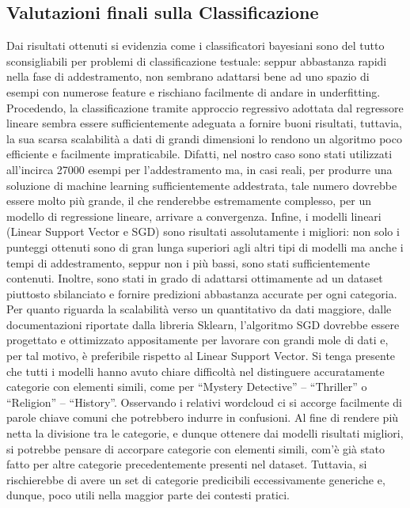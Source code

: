 \documentclass[12pt,oneside]{article}
\begin{document}
    \begin{enumerate}
    \subsection{Valutazioni finali sulla Classificazione}
    \begin{justify}
    Dai risultati ottenuti si evidenzia come i classificatori bayesiani sono del tutto sconsigliabili per problemi di classificazione testuale: seppur abbastanza rapidi nella fase di addestramento, non sembrano adattarsi bene ad uno spazio di esempi con numerose feature e rischiano facilmente di andare in underfitting.
    Procedendo, la classificazione tramite approccio regressivo adottata dal regressore lineare sembra essere sufficientemente adeguata a fornire buoni risultati, tuttavia, la sua scarsa scalabilità a dati di grandi dimensioni lo rendono un algoritmo poco efficiente e facilmente impraticabile. Difatti, nel nostro caso sono stati utilizzati all’incirca 27000 esempi per l’addestramento ma, in casi reali, per produrre una soluzione di machine learning sufficientemente addestrata, tale numero dovrebbe essere molto più grande, il che renderebbe estremamente complesso, per un modello di regressione lineare, arrivare a convergenza.
    Infine, i modelli lineari (Linear Support Vector e SGD) sono risultati assolutamente i migliori: non solo i punteggi ottenuti sono di gran lunga superiori agli altri tipi di modelli ma anche i tempi di addestramento, seppur non i più bassi, sono stati sufficientemente contenuti. Inoltre, sono stati in grado di adattarsi ottimamente ad un dataset piuttosto sbilanciato e fornire predizioni abbastanza accurate per ogni categoria. Per quanto riguarda la scalabilità verso un quantitativo da dati maggiore, dalle documentazioni riportate dalla libreria Sklearn,  l’algoritmo SGD dovrebbe essere progettato e ottimizzato appositamente per lavorare con grandi mole di dati e, per tal motivo, è preferibile rispetto al Linear Support Vector.
    Si tenga presente che tutti i modelli hanno avuto chiare difficoltà nel distinguere accuratamente categorie con elementi simili, come per “Mystery Detective” – “Thriller” o “Religion” – “History”. Osservando i relativi wordcloud ci si accorge facilmente di parole chiave comuni che potrebbero indurre in confusioni. Al fine di rendere più netta la divisione tra le categorie, e dunque ottenere dai modelli risultati migliori, si potrebbe pensare di accorpare categorie con elementi simili, com’è già stato fatto per altre categorie precedentemente presenti nel dataset. Tuttavia, si rischierebbe di avere un set di categorie predicibili eccessivamente generiche e, dunque, poco utili nella maggior parte dei contesti pratici.
    \end{justify}
    \end{enumerate}
\end{document}
